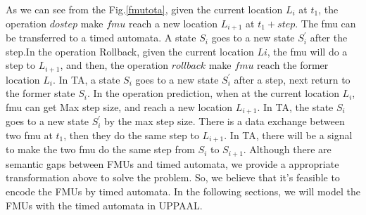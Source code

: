 %
As we can see from the Fig.\ref{fmutota}, given the current location $L_{i}$ at $t_{1}$, the operation $dostep$ make $fmu$ reach a new location $L_{i+1}$ at $t_{1}+step$. The fmu can be transferred to a timed automata. A state $S_{i}$ goes to a new state $S_{i}^{\prime}$ after the step.In the operation Rollback, given the current location $L{i}$, the fmu will do a step to $L_{i+1}$, and then, the operation $rollback$ make $fmu$ reach the former location $L_{i}$. In TA, a state $S_{i}$ goes to a new state $S_{i}^{\prime}$ after a step, next return to the former state $S_{i}$. In the operation prediction, when at the current location $L_{i}$, fmu can get Max step size, and reach a new location $L_{i+1}$. In TA, the state $S_{i}$ goes to a new state $S_{i}^{\prime}$ by the max step size. There is a data exchange between two fmu at $t_{1}$, then they do the same step to $L_{i+1}$. In TA, there will be a signal to make the two fmu do the same step from $S_{i}$ to $S_{i+1}$.
Although there are semantic gaps between FMUs and timed automata, we provide a  appropriate transformation above to solve the problem. So, we believe that it's feasible to encode the FMUs by timed automata. In the following sections, we will model the FMUs with the timed automata in UPPAAL.


